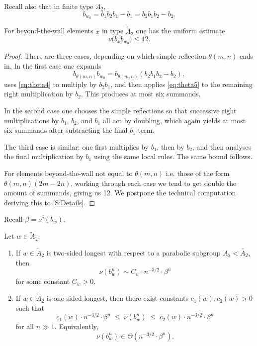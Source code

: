 \documentclass[a4paper,11pt]{amsart}
\newcommand{\wt}{\widetilde}
\newcommand{\nuop}{\nu}
\numberwithin{equation}{subsection}
\theoremstyle{definition}
\theoremstyle{remark}
\begin{document}
Recall also that in finite type $A_2$,
\[
b_{w_0}=b_1b_2b_1-b_1=b_2b_1b_2-b_2.
\]

\begin{Lemma}\label{prop:uniform6}
For beyond-the-wall elements $x$ in type $\wt A_2$ one has the uniform estimate
\[
\nuop\bigl(b_xb_{w_0}\bigr)\le 12.
\]
\end{Lemma}

\begin{proof}
There are three cases, depending on which simple reflection $\theta(m,n)$ ends in.
In the first case one expands
\[
b_{\theta(m,n)}b_{w_0}=b_{\theta(m,n)}(b_2b_1b_2-b_2),
\]
uses \autoref{eq:theta4} to multiply by $b_2b_1$, and then applies \autoref{eq:theta5}
to the remaining right multiplication by $b_2$.
This produces at most six summands.

In the second case one chooses the simple reflections so that successive right multiplications by
$b_1$, $b_2$, and $b_1$ all act by doubling, which again yields at most six summands after subtracting the final $b_1$ term.

The third case is similar: one first multiplies by $b_1$, then by $b_2$, and then analyses the final multiplication by $b_1$ using the same local rules.
The same bound follows.

For elements beyond-the-wall not equal to $\theta(m,n)$ i.e. those of the form $\theta(m,n)(2m-2n)$, working through each case we tend to get double the amount of summands, giving us 12. We postpone the technical computation deriving this to \autoref{S:Details}.
\end{proof}

Recall $\beta=\nu^\delta(b_w)$.

\begin{Theorem}\label{thm:a2-longest}
Let $w \in \widetilde A_2$.
\begin{enumerate}
\item
If $w \in \widetilde A_2$ is two-sided longest with respect to a parabolic subgroup $A_2 < \widetilde{A_2}$, then
\[
\nuop(b_w^n)\sim C_w\cdot n^{-3/2}\cdot\beta^n
\]
for some constant $C_w>0$.

\item
If $w \in \widetilde A_2$ is one-sided longest, then there exist constants $c_1(w), c_2(w)>0$ such that
\[
c_1(w)\cdot n^{-3/2}\cdot\beta^n
\;\le\;
\nuop(b_w^n)
\;\le\;
c_2(w)\cdot n^{-3/2}\cdot\beta^n
\]
for all $n\gg 1$.
Equivalently,
\[
\nuop(b_w^n)\in\Theta(n^{-3/2}\cdot \beta^n).
\]
\end{enumerate}
\end{Theorem}
\end{document}
